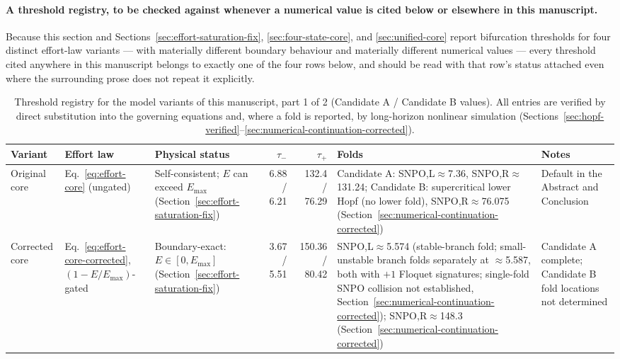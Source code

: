 \documentclass[twocolumn,10pt]{article}
\begin{document}
\paragraph{A threshold registry, to be checked against whenever a numerical value is cited below or elsewhere in this manuscript.} Because this section and Sections~\ref{sec:effort-saturation-fix}, \ref{sec:four-state-core}, and \ref{sec:unified-core} report bifurcation thresholds for four distinct effort-law variants --- with materially different boundary behaviour and materially different numerical values --- every threshold cited anywhere in this manuscript belongs to exactly one of the four rows below, and should be read with that row's status attached even where the surrounding prose does not repeat it explicitly.
\begin{table}[t]
\footnotesize
\caption{Threshold registry for the model variants of this manuscript, part 1 of 2 (Candidate A / Candidate B values). All entries are verified by direct substitution into the governing equations and, where a fold is reported, by long-horizon nonlinear simulation (Sections~\ref{sec:hopf-verified}--\ref{sec:numerical-continuation-corrected}).}
\label{tab:threshold-registry}
\begin{tabularx}{\textwidth}{@{}p{1.9cm}p{3.5cm}Xrrp{2.3cm}X@{}}
\toprule
\textbf{Variant} & \textbf{Effort law} & \textbf{Physical status} & $\tau_-$ & $\tau_+$ & Folds & \textbf{Notes} \\
\midrule
Original core & Eq.~\eqref{eq:effort-core} (ungated) & Self-consistent; $E$ can exceed $E_{\max}$ (Section~\ref{sec:effort-saturation-fix}) & 6.88 / 6.21 & 132.4 / 76.29 & Candidate A: SNPO,L$\approx$7.36, SNPO,R$\approx$131.24; Candidate B: supercritical lower Hopf (no lower fold), SNPO,R$\approx$76.075 (Section~\ref{sec:numerical-continuation-corrected}) & Default in the Abstract and Conclusion \\
Corrected core & Eq.~\eqref{eq:effort-core-corrected}, $(1-E/E_{\max})$-gated & Boundary-exact: $E\in[0,E_{\max}]$ (Section~\ref{sec:effort-saturation-fix}) & 3.67 / 5.51 & 150.36 / 80.42\footnotemark[1] & SNPO,L$\approx$5.574 (stable-branch fold; small-unstable branch folds separately at $\approx$5.587, both with $+1$ Floquet signatures; single-fold SNPO collision not established, Section~\ref{sec:numerical-continuation-corrected}); SNPO,R$\approx$148.3 (Section~\ref{sec:numerical-continuation-corrected}) & Candidate A complete; Candidate B fold locations not determined \\
\bottomrule
\end{tabularx}
\end{table}
\end{document}
